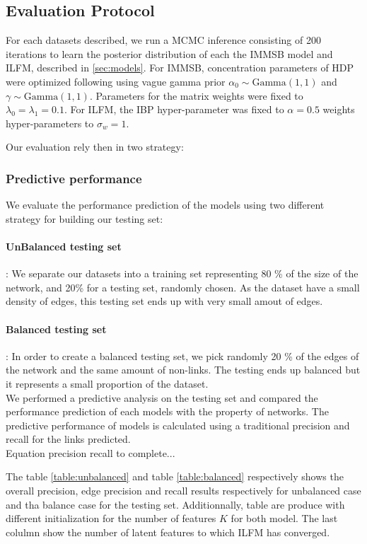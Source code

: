 \subsection{Evaluation Protocol}
For each datasets described,  we run a MCMC inference consisting of 200 iterations to learn the posterior distribution of each the IMMSB model and ILFM, described in \ref{sec:models}. For IMMSB, concentration parameters of HDP were optimized following \cite{HDP} using vague gamma prior $\alpha_0 \sim \text{Gamma}(1,1)$ and $\gamma \sim \text{Gamma}(1,1)$. Parameters for the matrix weights were fixed to $\lambda_0=\lambda_1=0.1$. For ILFM, the IBP hyper-parameter was fixed to $\alpha=0.5$ weights hyper-parameters to $\sigma_w = 1$.

Our evaluation rely then in two strategy:


\subsubsection{Predictive performance}
We evaluate the performance prediction of the models using two different strategy for building our testing set:

\paragraph{UnBalanced testing set}:
We separate our datasets into a training set representing 80 \% of the size of the network, and 20\% for a testing set, randomly chosen. As the dataset have a small density of edges, this testing set ends up with very small amout of edges.

\paragraph{Balanced testing set}:
In order to create a balanced testing set, we pick randomly 20 \% of the edges of the network and the same amount of non-links. The testing ends up balanced but it represents a small proportion of the dataset.~\\


We performed a predictive analysis on the testing set and compared the performance prediction of each models with the property of networks. 
The predictive performance of models is calculated using a traditional precision and recall for the links predicted.\\
Equation precision recall to complete...


The table \ref{table:unbalanced} and table \ref{table:balanced} respectively shows the overall precision, edge precision and recall results respectively for unbalanced case and tha balance case for the testing set. Additionnally, table are produce with different initialization for the number of features $K$ for both model. The last colulmn show the number of latent features to which ILFM has converged.

